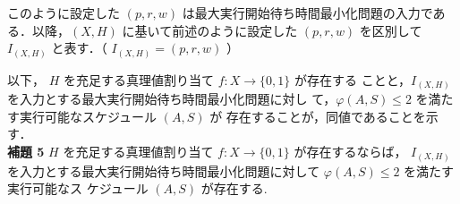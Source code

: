 \documentclass[12pt]{optlab-bachelor}
\begin{document}
このように設定した $(p,r,w)$ は最大実行開始待ち時間最小化問題の入力である．以降，$(X,H)$ に基いて前述のように設定した $(p,r,w)$ を区別して $I_{(X,H)}$ と表す．（ $I_{(X,H)} = (p,r,w)$ ）

以下， $H$ を充足する真理値割り当て $f : X \to \{0,1\}$ が存在する
ことと，$I_{(X,H)}$ を入力とする最大実行開始待ち時間最小化問題に対し
て，$\varphi(A,S) \le 2$ を満たす実行可能なスケジュール $(A,S)$ が
存在することが，同値であることを示す．\\

\noindent \textbf{補題 5}
$H$ を充足する真理値割り当て $f : X \to \{0,1\}$ が存在するならば，
$I_{(X,H)}$ を入力とする最大実行開始待ち時間最小化問題に対して
$\varphi(A, S) \le 2$ を満たす実行可能なス
ケジュール $(A, S)$ が存在する.\\ 
\end{document}
